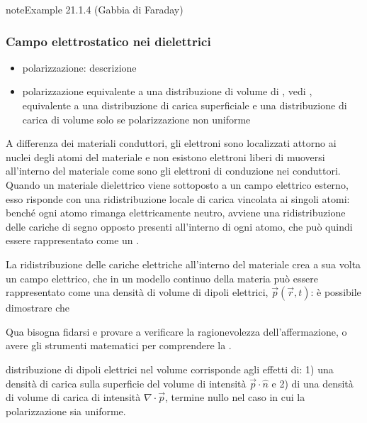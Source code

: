 \documentclass[letterpaper,10pt,italian]{jupyterBook}
\begin{document}
\label{ch/electromagnetism/electrostatics:faraday-cage}
\begin{sphinxadmonition}{note}{Example 21.1.4 (Gabbia di Faraday)}


\end{sphinxadmonition}


\subsubsection{Campo elettrostatico nei dielettrici}
\label{\detokenize{ch/electromagnetism/electrostatics:campo-elettrostatico-nei-dielettrici}}\label{\detokenize{ch/electromagnetism/electrostatics:physics-hs-electromagnetism-electrostatics-e-field-media-dielectrics}}\begin{itemize}
\item {} 
\sphinxAtStartPar
polarizzazione: descrizione

\item {} 
\sphinxAtStartPar
polarizzazione equivalente a una distribuzione di volume di , vedi {\hyperref[\detokenize{ch/electromagnetism/electrostatics:electric-dipole}]{}}, equivalente a una distribuzione di carica superficiale e una distribuzione di carica di volume solo se polarizzazione non uniforme

\end{itemize}

\sphinxAtStartPar
A differenza dei materiali conduttori, gli elettroni sono localizzati attorno ai nuclei degli atomi del materiale e non esistono elettroni liberi di muoversi all’interno del materiale \sphinxhyphen{} come sono gli elettroni di conduzione nei conduttori. Quando un materiale dielettrico viene sottoposto a un campo elettrico esterno, esso risponde con una ridistribuzione locale di carica vincolata ai singoli atomi: benché ogni atomo rimanga elettricamente neutro, avviene una ridistribuzione delle cariche di segno opposto presenti all’interno di ogni atomo, che può quindi essere rappresentato come un .

\sphinxAtStartPar
La ridistribuzione delle cariche elettriche all’interno del materiale crea a sua volta un campo elettrico, che in un modello continuo della materia può essere rappresentato come una densità di volume di dipoli elettrici, \(\vec{p}(\vec{r},t)\): è possibile dimostrare che%
\begin{footnote}[1]\sphinxAtStartFootnote
Qua bisogna fidarsi e provare a verificare la ragionevolezza dell’affermazione, o avere gli strumenti matematici per comprendere la .
%
\end{footnote} distribuzione di dipoli elettrici nel volume corrisponde agli effetti di: 1) una densità di carica sulla superficie del volume di intensità \(\vec{p} \cdot \hat{n}\) e 2) di una densità di volume di carica di intensità \(\nabla \cdot \vec{p}\), termine nullo nel caso in cui la polarizzazione sia uniforme.
\end{document}
